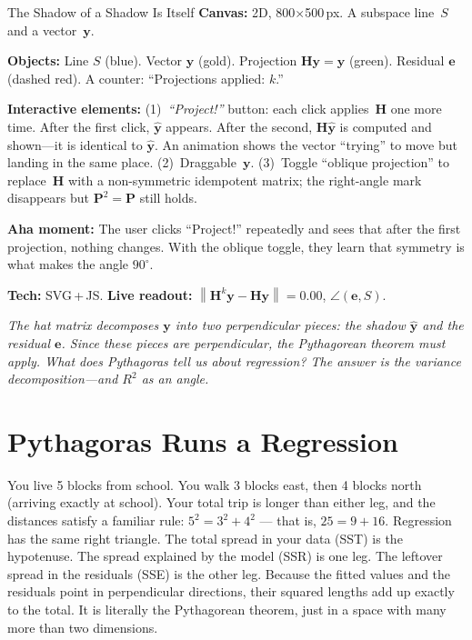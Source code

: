 \documentclass[11pt,a4paper]{article}
\theoremstyle{plain}
\theoremstyle{definition}
\newcommand{\yhat}{\hat{\bm{y}}}
\newcommand{\by}{\bm{y}}
\newcommand{\be}{\bm{e}}
\newcommand{\bH}{\bm{H}}
\newcommand{\norm}[1]{\left\lVert #1 \right\rVert}
\begin{document}
\begin{vizspec}{The Shadow of a Shadow Is Itself}
\textbf{Canvas:} 2D, 800$\times$500\,px.  A subspace line~$S$ and a vector~$\by$.

\textbf{Objects:} Line $S$ (\textcolor{colspace}{blue}).  Vector $\by$
(\textcolor{response}{gold}).  Projection $\bH\by = \yhat$
(\textcolor{projection}{green}).  Residual $\be$ (dashed
\textcolor{residual}{red}).  A counter: ``Projections applied: $k$.''

\textbf{Interactive elements:}
(1)~\emph{``Project!''} button: each click applies~$\bH$ one more time.
After the first click, $\yhat$ appears.  After the second, $\bH\yhat$
is computed and shown---it is identical to $\yhat$.  An animation shows
the vector ``trying'' to move but landing in the same place.
(2)~Draggable~$\by$.
(3)~Toggle ``oblique projection'' to replace~$\bH$ with a non-symmetric
idempotent matrix; the right-angle mark disappears but $\bm{P}^2 = \bm{P}$ still holds.

\textbf{Aha moment:} The user clicks ``Project!'' repeatedly and sees
that after the first projection, nothing changes.  With the oblique
toggle, they learn that symmetry is what makes the angle $90^\circ$.

\textbf{Tech:} SVG\,+\,JS.
\quad \textbf{Live readout:}
$\norm{\bH^k\by - \bH\by} = 0.00$, $\angle(\be, S)$.
\end{vizspec}

\medskip
\noindent\textit{The hat matrix decomposes $\by$ into two perpendicular
pieces: the shadow $\yhat$ and the residual $\be$.
Since these pieces are perpendicular, the Pythagorean theorem must
apply.
What does Pythagoras tell us about regression?
The answer is the variance decomposition---and $R^2$ as an angle.}


\section{Pythagoras Runs a Regression}\label{sec:pythagoras}

\begin{toystory}
You live 5 blocks from school.  You walk 3 blocks east, then 4 blocks
north (arriving exactly at school).  Your total trip is longer than
either leg, and the distances satisfy a familiar rule:
$5^2 = 3^2 + 4^2$ --- that is, $25 = 9 + 16$.
Regression has the same right triangle.  The total spread in your data
(SST) is the hypotenuse.  The spread explained by the model (SSR) is
one leg.  The leftover spread in the residuals (SSE) is the other leg.
Because the fitted values and the residuals point in perpendicular
directions, their squared lengths add up exactly to the total.
It is literally the Pythagorean theorem, just in a space with many more
than two dimensions.
\end{toystory}
\end{document}
